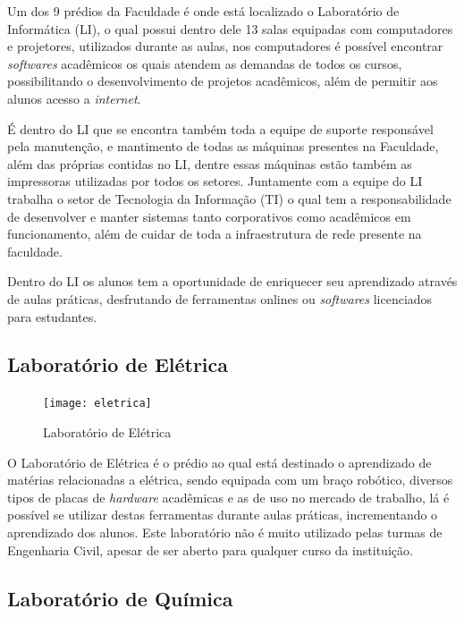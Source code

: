 \documentclass[
	12pt,				%
	oneside,			%
	a4paper,			%
	chapter=TITLE,		%
	section=TITLE,		%
	sumario=tradicional %
	english,			%
	french,				%
	spanish,			%
	brazil				%
	]{abntex2}
\begin{document}
Um dos 9 prédios da Faculdade é onde está localizado o Laboratório de Informática (LI), o qual possui dentro dele 13 salas equipadas com computadores e projetores, utilizados durante as aulas, nos computadores é possível encontrar \textit{softwares} acadêmicos os quais atendem as demandas de todos os cursos, possibilitando o desenvolvimento de projetos acadêmicos, além de permitir aos alunos acesso a \textit{internet}.

É dentro do LI que se encontra também toda a equipe de suporte responsável pela manutenção, e mantimento de todas as máquinas presentes na Faculdade, além das próprias contidas no LI, dentre essas máquinas estão também as impressoras utilizadas por todos os setores. Juntamente com a equipe do LI trabalha o setor de Tecnologia da Informação (TI) o qual tem a responsabilidade de desenvolver e manter sistemas tanto corporativos como acadêmicos em funcionamento, além de cuidar de toda a infraestrutura de rede presente na faculdade.

Dentro do LI os alunos tem a oportunidade de enriquecer seu aprendizado através de aulas práticas, desfrutando de ferramentas onlines ou \textit{softwares} licenciados para estudantes.

\subsection*{Laboratório de Elétrica}

\begin{figure}[htb]
	\caption{\label{fig:eletrica} Laboratório de Elétrica}
	\begin{center}
		\texttt{[image: eletrica]}
	\end{center}
\end{figure}

O Laboratório de Elétrica é o prédio ao qual está destinado o aprendizado de matérias relacionadas a elétrica, sendo equipada com um braço robótico, diversos tipos de placas de \textit{hardware} acadêmicas e as de uso no mercado de trabalho, lá é possível se utilizar destas ferramentas durante aulas práticas, incrementando o aprendizado dos alunos. Este laboratório não é muito utilizado pelas turmas de Engenharia Civil, apesar de ser aberto para qualquer curso da instituição.

\subsection{Laboratório de Química}
\end{document}
